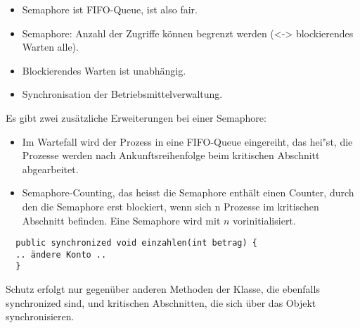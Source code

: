 \begin{answer}
\begin{itemize}

  \item Semaphore ist FIFO-Queue, ist also fair.

  \item Semaphore: Anzahl der Zugriffe können begrenzt werden (<-> blockierendes Warten alle).

  \item Blockierendes Warten ist unabhängig.

  \item Synchronisation der Betriebsmittelverwaltung.
\end{itemize}

Es gibt zwei zusätzliche Erweiterungen bei einer Semaphore:

\begin{itemize}

  \item Im Wartefall wird der Prozess in eine FIFO-Queue eingereiht, das hei"st, die Prozesse werden nach Ankunftsreihenfolge beim kritischen Abschnitt abgearbeitet.

  \item Semaphore-Counting, das heisst die Semaphore enthält einen Counter, durch den die Semaphore erst blockiert, wenn sich n Prozesse im kritischen Abschnitt befinden. Eine Semaphore wird mit $n$ vorinitialisiert.

\end{itemize}
\end{answer}

\begin{answer}
\begin{verbatim}
  public synchronized void einzahlen(int betrag) {
  .. ändere Konto ..
  }
\end{verbatim}

Schutz erfolgt nur gegenüber anderen Methoden der Klasse, die ebenfalls synchronized sind, und kritischen Abschnitten, die sich über das Objekt synchronisieren.
\end{answer}

